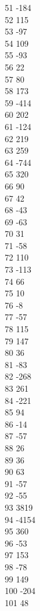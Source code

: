 { 51	-184 \\
 52	115 \\
 53	-97 \\
 54	109 \\
 55	-93 \\
 56	22 \\
 57	80 \\
 58	173 \\
 59	-414 \\
 60	202 \\
 61	-124 \\
 62	219 \\
 63	259 \\
 64	-744 \\
 65	320 \\
 66	90 \\
 67	42 \\
 68	-43 \\
 69	-63 \\
 70	31 \\
 71	-58 \\
 72	110 \\
 73	-113 \\
 74	66 \\
 75	10 \\
 76	-8 \\
 77	-57 \\
 78	115 \\
 79	147 \\
 80	36 \\
 81	-83 \\
 82	-268 \\
 83	261 \\
 84	-221 \\
 85	94 \\
 86	-14 \\
 87	-57 \\
 88	26 \\
 89	36 \\
 90	63 \\
 91	-57 \\
 92	-55 \\
 93	3819 \\
 94	-4154 \\
 95	360 \\
 96	-53 \\
 97	153 \\
 98	-78 \\
 99	149 \\
 100	-204 \\
 101	48 \\
}
